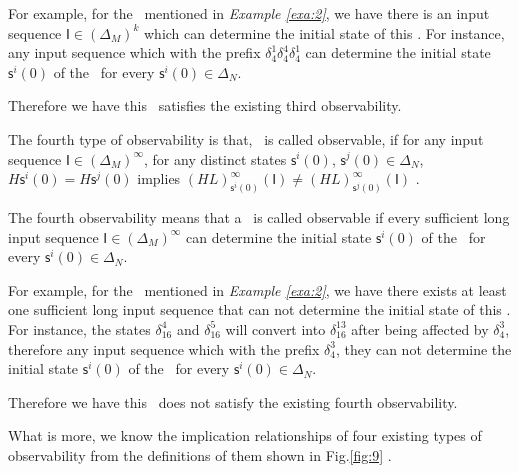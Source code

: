 \begin{example}
For example, for the \BCN\ mentioned in {\em Example \ref{exa:2}}, we have there is an input sequence $\mathsf{I}\in(\Delta_M)^k$ which can determine the initial state of this \BCN. For instance, any input sequence which with the prefix $\delta_{4}^1\delta_{4}^4\delta_{4}^1$ can determine the initial state $\mathsf{s}^{i}(0)$ of the \BCN\ for every $\mathsf{s}^{i}(0)\in\Delta_N$.

Therefore we have this \BCN\ satisfies the existing third observability.
\label{exa:6}
\end{example}  
\begin{definition}
	The fourth type of observability is that, \BCN\ is called observable, if for any input sequence $\mathsf{I}\in(\Delta_M)^{\infty}$, for any distinct states $\mathsf{s}^{i}(0)$, $\mathsf{s}^{j}(0) \in \Delta_N$, $H\mathsf{s}^{i}(0)=H\mathsf{s}^{j}(0)$ implies $(HL)^{\infty}_{\mathsf{s}^{i}(0)}(\mathsf{I})\neq (HL)^{\infty}_{\mathsf{s}^{j}(0)}(\mathsf{I})$ \cite{Fornasini2013Observability}.
\end{definition}

The fourth observability means that a \BCN\ is called observable if every sufficient long input sequence $\mathsf{I}\in(\Delta_M)^{\infty}$ can determine the initial state $\mathsf{s}^{i}(0)$ of the \BCN\ for every $\mathsf{s}^{i}(0)\in\Delta_N$.
\begin{example}
For example, for the \BCN\ mentioned in {\em Example \ref{exa:2}}, we have there exists at least one sufficient long input sequence that can not determine the initial state of this \BCN. For instance, the states $\delta_{16}^4$ and $\delta_{16}^5$  will convert into $\delta_{16}^{13}$ after being affected by $\delta_{4}^3$, therefore any input sequence which with the prefix $\delta_{4}^3$, they can not determine the initial state $\mathsf{s}^{i}(0)$ of the \BCN\ for every $\mathsf{s}^{i}(0)\in\Delta_N$.

Therefore we have this \BCN\ does not satisfy the existing fourth observability.
\label{exa:7}
\end{example}  

What is more, we know the implication relationships of four existing types of observability from the definitions of them shown in Fig.\ref{fig:9} \cite{Zhang2016Observability}. 

